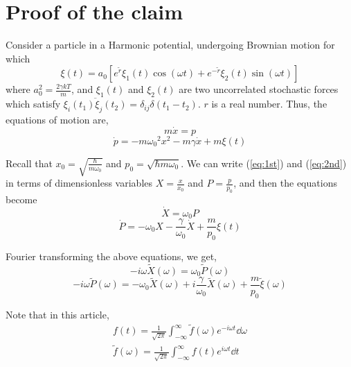 \documentclass[12pt, twoside]{article}
\begin{document}
\section{Proof of the claim}
Consider a particle in a Harmonic potential, undergoing Brownian motion for which \begin{equation}\label{eq: stochastic}
	\xi(t) =  a_0 [e^{\tilde{r}} \xi_1(t) \cos(\omega t) + e^{-{\tilde{r}}} \xi_2(t)\sin(\omega t)]
\end{equation} where $a_0 ^ 2 = \frac{2 \gamma k T}{m}$, and $\xi_1(t)$ and $\xi_2(t)$ are two uncorrelated stochastic forces which satisfy $\overline{\xi_i(t_1)\xi_j(t_2)} = \delta_{ij}\delta(t_1 - t_2)$. $r$ is a real number. Thus, the equations of motion are, \begin{equation}\label{eq:1st}
m \dot{x} = p
\end{equation}
\begin{equation}\label{eq:2nd}
	\dot{p} = -m{\omega_0}^2 x^2 - m\gamma\dot{x} + m\xi(t)
\end{equation}

Recall that $x_0 =\sqrt{\frac{\hbar}{ m\omega_0}}$ and $p_0 = \sqrt{\hbar m \omega_0}$. We can write (\ref{eq:1st}) and (\ref{eq:2nd}) in terms of dimensionless variables $X = \frac{x}{x_0}$ and $P = \frac{p}{p_0}$, and then the equations become
\begin{equation}\label{eq:1}
	\dot{X} =\omega_0 P
\end{equation}
\begin{equation}\label{eq:2}
	\dot{P} = -\omega_0 X -\frac{\gamma}{\omega_0}\dot{X} + \frac{m}{p_0}\xi(t)
\end{equation}

Fourier transforming the above equations, we get, \begin{equation}\label{eq:3}
-i\omega\widetilde{X}(\omega) =\omega_0 \widetilde{P}(\omega)
\end{equation}
\begin{equation}\label{eq:4}
-i\omega\widetilde{P}(\omega) = -\omega_0 \widetilde{X}(\omega) +i\frac{\gamma}{\omega_0}\widetilde{X}(\omega) + \frac{m}{p_0}\widetilde{\xi}(\omega)
\end{equation}

Note that in this article, $$
\begin{array} { l } { f ( t ) = \frac { 1 } { \sqrt { 2 \pi } } \int _ { - \infty } ^ { \infty } \tilde { f } ( \omega ) e ^ { - i \omega t } \dd{\omega} } \\ { \tilde { f } ( \omega ) = \frac { 1 } { \sqrt { 2 \pi } } \int _ { - \infty } ^ { \infty } f ( t ) e ^ { i \omega t } \dd{t} } \end{array}
$$
\end{document}
